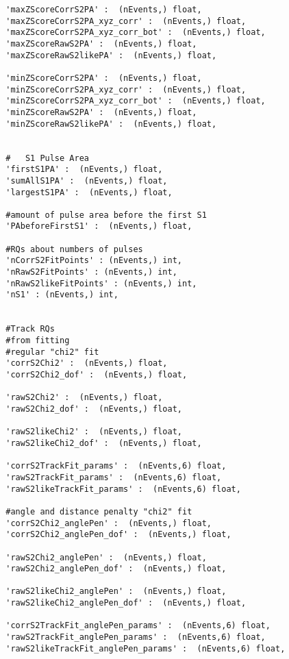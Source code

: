 \begin{verbatim}
        'maxZScoreCorrS2PA' :  (nEvents,) float,
        'maxZScoreCorrS2PA_xyz_corr' :  (nEvents,) float,
        'maxZScoreCorrS2PA_xyz_corr_bot' :  (nEvents,) float,
        'maxZScoreRawS2PA' :  (nEvents,) float,
        'maxZScoreRawS2likePA' :  (nEvents,) float,
        
        'minZScoreCorrS2PA' :  (nEvents,) float,
        'minZScoreCorrS2PA_xyz_corr' :  (nEvents,) float,
        'minZScoreCorrS2PA_xyz_corr_bot' :  (nEvents,) float,
        'minZScoreRawS2PA' :  (nEvents,) float,
        'minZScoreRawS2likePA' :  (nEvents,) float,
        
        
        #   S1 Pulse Area
        'firstS1PA' :  (nEvents,) float,
        'sumAllS1PA' :  (nEvents,) float,
        'largestS1PA' :  (nEvents,) float,
        
        #amount of pulse area before the first S1
        'PAbeforeFirstS1' :  (nEvents,) float,
        
        #RQs about numbers of pulses
        'nCorrS2FitPoints' : (nEvents,) int, 
        'nRawS2FitPoints' : (nEvents,) int, 
        'nRawS2likeFitPoints' : (nEvents,) int, 
        'nS1' : (nEvents,) int,
        
        
        #Track RQs
        #from fitting
        #regular "chi2" fit
        'corrS2Chi2' :  (nEvents,) float,
        'corrS2Chi2_dof' :  (nEvents,) float,
        
        'rawS2Chi2' :  (nEvents,) float,
        'rawS2Chi2_dof' :  (nEvents,) float,
        
        'rawS2likeChi2' :  (nEvents,) float,
        'rawS2likeChi2_dof' :  (nEvents,) float,
        
        'corrS2TrackFit_params' :  (nEvents,6) float,
        'rawS2TrackFit_params' :  (nEvents,6) float,
        'rawS2likeTrackFit_params' :  (nEvents,6) float,
        
        #angle and distance penalty "chi2" fit
        'corrS2Chi2_anglePen' :  (nEvents,) float,
        'corrS2Chi2_anglePen_dof' :  (nEvents,) float,
        
        'rawS2Chi2_anglePen' :  (nEvents,) float,
        'rawS2Chi2_anglePen_dof' :  (nEvents,) float,
        
        'rawS2likeChi2_anglePen' :  (nEvents,) float,
        'rawS2likeChi2_anglePen_dof' :  (nEvents,) float,
        
        'corrS2TrackFit_anglePen_params' :  (nEvents,6) float,
        'rawS2TrackFit_anglePen_params' :  (nEvents,6) float,
        'rawS2likeTrackFit_anglePen_params' :  (nEvents,6) float,     


\end{verbatim}
